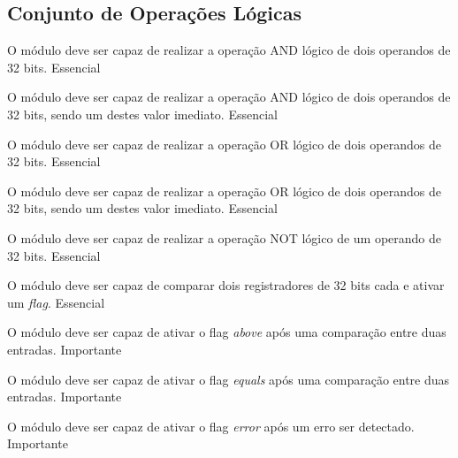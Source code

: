 \subsection{Conjunto de Operações Lógicas} 
  
    \begin{functional}
    
      {O módulo deve ser capaz de realizar a operação AND lógico de dois operandos de 32 bits.}
      {Essencial}
      
      {O módulo deve ser capaz de realizar a operação AND lógico de dois operandos de 32 bits, sendo um destes valor imediato.}
      {Essencial}

      {O módulo deve ser capaz de realizar a operação OR lógico de dois operandos de 32 bits.}
      {Essencial}  
      
      {O módulo deve ser capaz de realizar a operação OR lógico de dois operandos de 32 bits, sendo um destes valor imediato.}
      {Essencial} 
      
      {O módulo deve ser capaz de realizar a operação NOT lógico de um operando de 32 bits.}
      {Essencial}   
      
      {O módulo deve ser capaz de comparar dois registradores de 32 bits cada e ativar um \textit{flag}.}
      {Essencial}
      
      {O módulo deve ser capaz de ativar o flag \textit{above} após uma comparação entre duas entradas.}
      {Importante}
      
      {O módulo deve ser capaz de ativar o flag \textit{equals} após uma comparação entre duas entradas.}
      {Importante}
      
      {O módulo deve ser capaz de ativar o flag \textit{error} após um erro ser detectado.}
      {Importante}
      
    \end{functional}